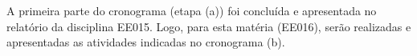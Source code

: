 \documentclass[a4paper, 12pt]{article}
\begin{document}
A primeira parte do cronograma (etapa (a)) foi concluída e apresentada no relatório  da disciplina EE015. Logo, para esta matéria (EE016), serão realizadas e apresentadas as atividades indicadas no cronograma (b).

\nocite{*}


\end{document}
